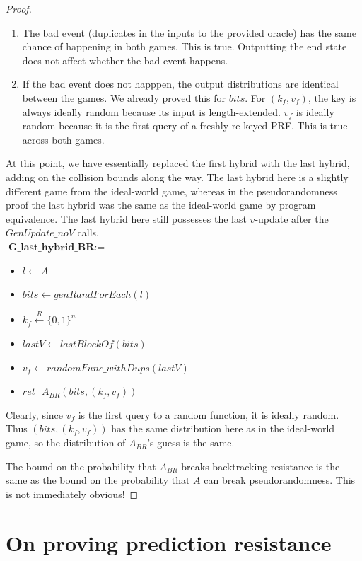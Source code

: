\documentclass[12pt,lot, lof]{puthesis}
\newenvironment{game}
{ \begin{itemize}[noitemsep,nolistsep] 
}
{ \end{itemize}                  }
\newcommand{\s} {\textrm{ }}
\newcommand{\samp}{\xleftarrow{R} \{0,1\}}
\newcommand{\lar}{\leftarrow}
\begin{document}
{\begin{proof}
\begin{enumerate}
\item The bad event (duplicates in the inputs to the provided oracle) has the same chance of happening in both games. This is true. Outputting the end state does not affect whether the bad event happens.
\item If the bad event does not happpen, the output distributions are identical between the games. We already proved this for $bits$. For $(k_f, v_f)$, the key is always ideally random because its input is length-extended. $v_f$ is ideally random because it is the first query of a freshly re-keyed PRF. This is true across both games.
\end{enumerate}

At this point, we have essentially replaced the first hybrid with the last hybrid, adding on the collision bounds along the way. The last hybrid here is a slightly different game from the ideal-world game, whereas in the pseudorandomness proof the last hybrid was the same as the ideal-world game by program equivalence. The last hybrid here still possesses the last $v$-update after the $GenUpdate\_noV$ calls.\\

$\textbf{G\_last\_hybrid\_BR} := $
\begin{game}
\item[] $l \leftarrow A$ 
\item[] $bits \leftarrow genRandForEach(l)$
\item[] $k_f \samp^n$
\item[] $lastV \lar lastBlockOf(bits)$
\item[] $v_f \lar randomFunc\_withDups(lastV)$
\item[] $ret \s A_{BR}(bits, (k_f,v_f))$ \\
\end{game}

Clearly, since $v_f$ is the first query to a random function, it is ideally random. Thus $(bits, (k_f, v_f))$ has the same distribution here as in the ideal-world game, so the distribution of $A_{BR}$'s guess is the same.

The bound on the probability that $A_{BR}$ breaks backtracking resistance is the same as the bound on the probability that $A$ can break pseudorandomness. This is not immediately obvious!

\end{proof}

\section{On proving prediction resistance}

}
\end{document}
